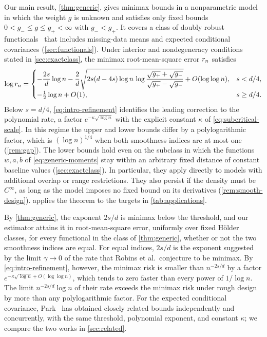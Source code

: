 Our main result, \cref{thm:generic}, gives minimax bounds in a
nonparametric model in which the weight $g$ is unknown and satisfies
only fixed bounds $0<g_-\le g\le g_+<\infty$ with $g_-<g_+$. It covers
a class of doubly robust functionals~\cite[Section~3.1]{hoif2008} that
includes missing-data means and expected conditional covariances
(\cref{sec:functionals}). Under interior and nondegeneracy
conditions stated in \cref{sec:exactclass}, the minimax
root-mean-square error $r_n$ satisfies
\begin{equation}\label{eq:intro-refinement}
 \log r_n=
 \begin{cases}
 -\dfrac{2s}{d}\log n
 -\dfrac{2}{d}\sqrt{2s(d-4s)\log n\,
   \log\dfrac{\sqrt{g_+}+\sqrt{g_-}}{\sqrt{g_+}-\sqrt{g_-}}}
       +O(\log\log n), & s<d/4,\\
 -\tfrac12\log n+O(1), & s\ge d/4.
 \end{cases}
\end{equation}
Below $s=d/4$, \eqref{eq:intro-refinement} identifies the
leading correction to the polynomial rate, a factor
$e^{-\kappa\sqrt{\log n}}$ with the explicit constant $\kappa$ of
\eqref{eq:subcritical-scale}. In this regime the
upper and lower bounds differ by a polylogarithmic factor, which is
$(\log n)^{1/4}$ when both smoothness indices are at most one
(\cref{rem:gap}). The lower bounds hold even on the subclass in
which the functions $w,a,b$ of \eqref{eq:generic-moments} stay within
an arbitrary fixed distance of constant baseline values
(\cref{sec:exactclass}). In particular, they apply directly to
models with additional overlap or range restrictions. They also persist if the
density must be $C^\infty$, as long as the model imposes no fixed bound
on its derivatives (\cref{rem:smooth-design}).
 applies the theorem to the targets in
\cref{tab:applications}.

By \cref{thm:generic}, the exponent $2s/d$ is minimax below the
threshold, and our estimator attains it in root-mean-square error,
uniformly over fixed H\"older classes, for every functional in the class
of \cref{thm:generic}, whether or not the two smoothness indices are
equal. For equal indices, $2s/d$ is the exponent suggested
by the limit $\gamma\to0$ of the rate that Robins et al.\ conjecture to
be minimax. By \eqref{eq:intro-refinement}, however, the minimax risk is
smaller than $n^{-2s/d}$ by a factor $e^{-\kappa\sqrt{\log n}+O(\log\log n)}$,
which tends to zero faster than every power of $1/\log n$. The limit
$n^{-2s/d}\log n$ of their rate exceeds the minimax risk
under rough design by more than any polylogarithmic factor. For the
expected conditional covariance, Park~\cite{park} has obtained closely
related bounds independently and concurrently, with the same
threshold, polynomial exponent, and constant $\kappa$; we compare the
two works in \cref{sec:related}.

